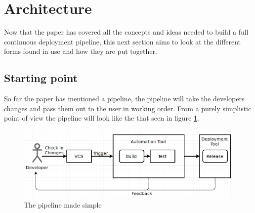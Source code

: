 %
%
%
%
%
%

\section{Architecture}

Now that the paper has covered all the concepts and ideas needed to build a full continuous deployment pipeline, this next section aims to look at the different forms found in use and how they are put together.

\subsection{Starting point}

So far the paper has mentioned a pipeline, the pipeline will take the developers changes and pass them out to the user in working order. From a purely simplistic point of view the pipeline will look like the that seen in figure \ref{fig:pipeline-simple}.

\begin{figure}[H]
	\centering
	\includegraphics[scale=0.45]{images/pipeline-simple.jpg}
	\caption{The pipeline made simple}
	\label{fig:pipeline-simple}
\end{figure}

